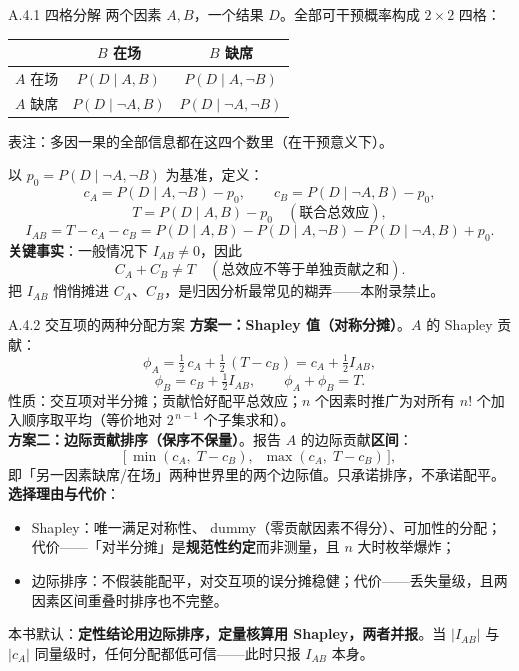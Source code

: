 \documentclass[../../main2.tex]{subfiles}
\begin{document}
	\begin{mathbox}{A.4.1 四格分解}
		两个因素 $A, B$，一个结果 $D$。全部可干预概率构成 $2 \times 2$ 四格：
		\begin{center}
		\begin{tabular}{lcc}
			\toprule
			 & $B$ 在场 & $B$ 缺席 \\
			\midrule
			$A$ 在场 & $P(D \mid A, B)$ & $P(D \mid A, \neg B)$ \\
			$A$ 缺席 & $P(D \mid \neg A, B)$ & $P(D \mid \neg A, \neg B)$ \\
			\bottomrule
		\end{tabular}

		{\small 表注：多因一果的全部信息都在这四个数里（在干预意义下）。}
		\end{center}
		以 $p_0 = P(D \mid \neg A, \neg B)$ 为基准，定义：
		\[ c_A = P(D \mid A, \neg B) - p_0, \qquad c_B = P(D \mid \neg A, B) - p_0, \]
		\[ T = P(D \mid A, B) - p_0 \quad (\text{联合总效应}), \]
		\[ I_{AB} = T - c_A - c_B = P(D \mid A, B) - P(D \mid A, \neg B) - P(D \mid \neg A, B) + p_0. \]
		\textbf{关键事实}：一般情况下 $I_{AB} \neq 0$，因此
		\[ C_A + C_B \neq T \quad (\text{总效应不等于单独贡献之和}). \]
		把 $I_{AB}$ 悄悄摊进 $C_A$、$C_B$，是归因分析最常见的糊弄——本附录禁止。
	\end{mathbox}

	\begin{mathbox}{A.4.2 交互项的两种分配方案}
		\textbf{方案一：Shapley 值（对称分摊）}。$A$ 的 Shapley 贡献：
		\[ \phi_A = \tfrac{1}{2}\, c_A + \tfrac{1}{2}\, (T - c_B) = c_A + \tfrac{1}{2} I_{AB}, \]
		\[ \phi_B = c_B + \tfrac{1}{2} I_{AB}, \qquad \phi_A + \phi_B = T. \]
		性质：交互项对半分摊；贡献恰好配平总效应；$n$ 个因素时推广为对所有 $n!$ 个加入顺序取平均（等价地对 $2^{\,n-1}$ 个子集求和）。\\[0.5em]
		\textbf{方案二：边际贡献排序（保序不保量）}。报告 $A$ 的边际贡献\textbf{区间}：
		\[ \big[\, \min(c_A,\; T - c_B),\;\; \max(c_A,\; T - c_B) \,\big], \]
		即「另一因素缺席/在场」两种世界里的两个边际值。只承诺排序，不承诺配平。\\[0.5em]
		\textbf{选择理由与代价}：
		\begin{itemize}
			\item Shapley：唯一满足对称性、 dummy（零贡献因素不得分）、可加性的分配；代价——「对半分摊」是\textbf{规范性约定}而非测量，且 $n$ 大时枚举爆炸；
			\item 边际排序：不假装能配平，对交互项的误分摊稳健；代价——丢失量级，且两因素区间重叠时排序也不完整。
		\end{itemize}
		本书默认：\textbf{定性结论用边际排序，定量核算用 Shapley，两者并报}。当 $|I_{AB}|$ 与 $|c_A|$ 同量级时，任何分配都低可信——此时只报 $I_{AB}$ 本身。
	\end{mathbox}
\end{document}
